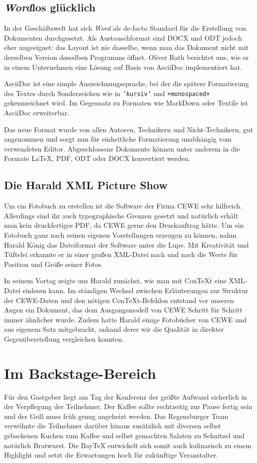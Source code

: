 \documentclass[ngerman]{dtk}
\begin{document}
\subsection{\textsl{Word}los glücklich}
In der Geschäftswelt hat sich \textsl{Word} als de-facto Standard für die Erstellung von Dokumenten durchgesetzt. Als Austauschformat sind DOCX und ODT jedoch eher ungeeignet: das Layout ist nie dasselbe, wenn man das Dokument nicht mit derselben Version desselben Programms öffnet.
Oliver Rath berichtet uns, wie er in einem Unternehmen eine Lösung auf Basis von AsciiDoc implementiert hat.

AsciiDoc ist eine simple Auszeichnungssprache, bei der die spätere Formatierung des Textes durch Sonderzeichen wie in \texttt{'kursiv'} und \texttt{+monospaced+} gekennzeichnet wird.
Im Gegensatz zu Formaten wie MarkDown oder Textile ist AsciiDoc erweiterbar.

Das neue Format wurde von allen Autoren, Technikern und Nicht-Technikern, gut angenommen und sorgt nun für einheitliche Formatierung unabhängig vom verwendeten Editor.
Abgeschlossene Dokumente können unter anderem in die Formate \LaTeX{}, PDF, ODT oder DOCX konvertiert werden.

\subsection{Die Harald XML Picture Show}
Um ein Fotobuch zu erstellen ist die Software der Firma CEWE sehr hilfreich. Allerdings sind ihr auch typographische Grenzen gesetzt und natürlich erhält man kein druckfertiges PDF, da CEWE gerne den Druckauftrag hätte.
Um ein Fotobuch ganz nach seinen eigenen Vorstellungen erzeugen zu können, nahm Harald König das Dateiformat der Software unter die Lupe.
Mit Kreativität und Tüftelei erkannte er in einer großen XML-Datei nach und nach die Werte für Position und Größe seiner Fotos.

In seinem Vortag zeigte uns Harald zunächst, wie man mit Con\TeX{}t eine XML-Datei einlesen kann.
Im ständigen Wechsel zwischen Erläuterungen zur Struktur der CEWE-Daten und den nötigen Con\TeX{}t-Befehlen entstand vor unseren Augen ein Dokument,
das dem Ausgangsmodell von CEWE Schritt für Schritt immer ähnlicher wurde.
Zudem hatte Harald einige Fotobücher von CEWE und aus eigenem Satz mitgebracht,
anhand derer wir die Qualität in direkter Gegenüberstellung vergleichen konnten.

\section{Im Backstage-Bereich}
Für den Gastgeber liegt am Tag der Konferenz der größte Aufwand sicherlich in der Verpflegung der Teilnehmer.
Der Kaffee sollte rechtzeitig zur Pause fertig sein und der Grill muss früh genug angeheizt werden.
Das Regensburger Team verwöhnte die Teilnehmer darüber hinaus zusätzlich mit diversen selbst gebackenen Kuchen zum Kaffee
und selbst gemachten Salaten zu Schnitzel und natürlich Bratwurst.
Die BayTeX entwickelt sich somit auch kulinarisch zu einem Highlight und setzt die Erwartungen hoch für zukünftige Veranstalter.
\end{document}
